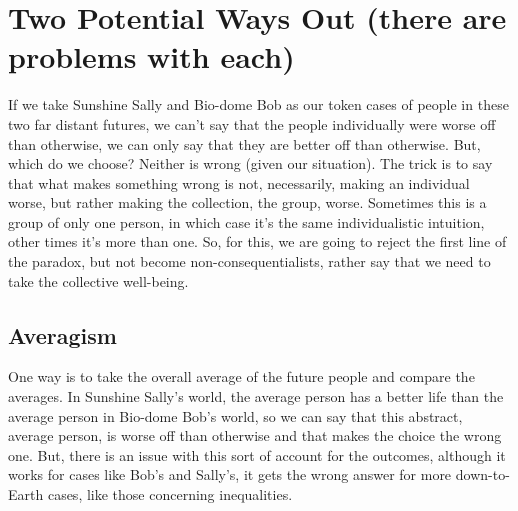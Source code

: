 \section{Two Potential Ways Out (there are problems with each)}

If we take Sunshine Sally and Bio-dome Bob as our token cases of people in these two far distant futures, we can’t say that the people individually were worse off than otherwise, we can only say that they are better off than otherwise. But, which do we choose? Neither is wrong (given our situation). The trick is to say that what makes something wrong is not, necessarily, making an individual worse, but rather making the collection, the group, worse. Sometimes this is a group of only one person, in which case it’s the same individualistic intuition, other times it’s more than one. So, for this, we are going to reject the first line of the paradox, but not become non-consequentialists, rather say that we need to take the collective well-being. 
\subsection{Averagism}

One way is to take the overall average of the future people and compare the averages. In Sunshine Sally’s world, the average person has a better life than the average person in Bio-dome Bob’s world, so we can say that this abstract, average person, is worse off than otherwise and that makes the choice the wrong one. But, there is an issue with this sort of account for the outcomes, although it works for cases like Bob's and Sally's, it gets the wrong answer for more down-to-Earth cases, like those concerning inequalities. 


